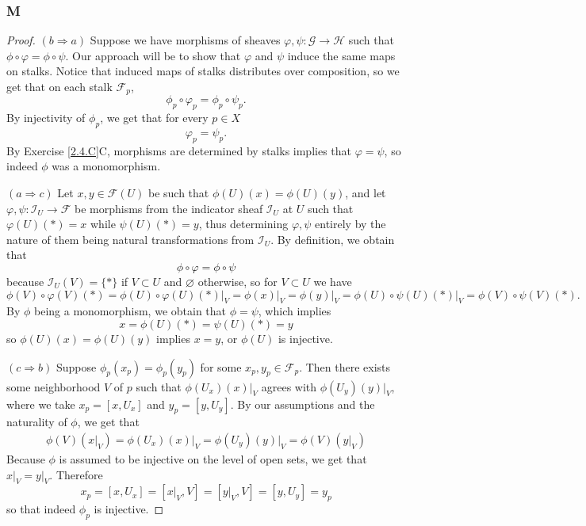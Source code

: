 \documentclass{article}
\newcommand{\fI}{\mathscr{I}}
\newcommand{\fF}{\mathscr{F}}
\newcommand{\fG}{\mathscr{G}}
\newcommand{\fH}{\mathscr{H}}
\let\emptyset\varnothing
\begin{document}
\subsubsection{M}\label{2.4.M}
\begin{proof}
    \item [$(b\Rightarrow a)$] Suppose we have morphisms of sheaves $\varphi,\psi:\fG\to \fH$ such that $\phi\circ \varphi=\phi\circ \psi$. Our approach will be to show that $\varphi$ and $\psi$ induce the same maps on stalks. Notice that induced maps of stalks distributes over composition, so we get that on each stalk $\fF_p$,
    \[
    \phi_p\circ \varphi_p=\phi_p\circ \psi_p.
    \]
    By injectivity of $\phi_p$, we get that for every $p\in X$
    \[
    \varphi_p=\psi_p.
    \]
    By Exercise \ref{2.4.C}C, morphisms are determined by stalks implies that $\varphi=\psi$, so indeed $\phi$ was a monomorphism.
    \item [$(a\Rightarrow c)$] 
    Let $x,y\in \fF(U)$ be such that $\phi(U)(x)=\phi(U)(y)$, and let $\varphi, \psi:\fI_U\to \fF$ be morphisms from the indicator sheaf $\fI_U$ at $U$ such that $\varphi(U)(*)=x$ while $\psi(U)(*)=y$, thus determining $\varphi,\psi$ entirely by the nature of them being natural transformations from $\fI_U$. By definition, we obtain that
    \[
    \phi\circ \varphi=\phi\circ \psi
    \]
    because $\fI_U(V)=\{*\}$ if $V\subset U$ and $\emptyset$ otherwise, so for $V\subset U$ we have
    \[
    \phi(V)\circ \varphi(V)(*)=\phi(U)\circ \varphi(U)(*)\vert_{V}=\phi(x)\vert_V=\phi(y)\vert_V=\phi(U)\circ \psi(U)(*)\vert_V=\phi(V)\circ \psi(V)(*).
    \]
    By $\phi$ being a monomorphism, we obtain that $\phi=\psi$, which implies \[
    x=\phi(U)(*)=\psi(U)(*)=y
    \]
    so $\phi(U)(x)=\phi(U)(y)$ implies $x=y$, or $\phi(U)$ is injective.
    \item [$(c\Rightarrow b)$]
    Suppose $\phi_p(x_p)=\phi_p(y_p)$ for some $x_p,y_p\in \fF_p$. Then there exists some neighborhood $V$ of $p$ such that $\phi(U_x)(x)\vert_V$ agrees with $\phi(U_y)(y)\vert_V$, where we take $x_p=[x,U_x]$ and $y_p=[y,U_y]$. By our assumptions and the naturality of $\phi$, we get that
    \begin{align*}
        \phi(V)(x\vert_V)=\phi(U_x)(x)\vert_V=\phi(U_y)(y)\vert_V=\phi(V)(y\vert_V)
    \end{align*}
    Because $\phi$ is assumed to be injective on the level of open sets, we get that $x\vert_V=y\vert_V$. Therefore
    \[
    x_p=[x,U_x]=[x\vert_V,V]=[y\vert_V,V]=[y,U_y]=y_p
    \]
    so that indeed $\phi_p$ is injective.
\end{proof}
\end{document}
